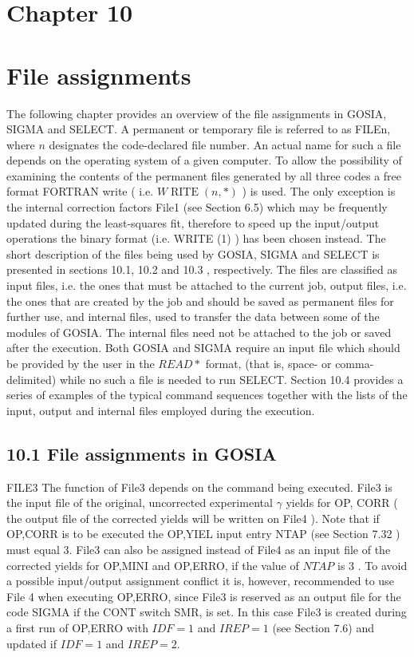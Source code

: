 \documentclass[10pt]{article}
\begin{document}
\section*{Chapter 10}
\section*{File assignments}
The following chapter provides an overview of the file assignments in GOSIA, SIGMA and SELECT. A permanent or temporary file is referred to as FILEn, where $n$ designates the code-declared file number. An actual name for such a file depends on the operating system of a given computer. To allow the possibility of examining the contents of the permanent files generated by all three codes a free format FORTRAN write ( i.e. $W \operatorname{RITE}(n, *)$ ) is used. The only exception is the internal correction factors File1 (see Section 6.5) which may be frequently updated during the least-squares fit, therefore to speed up the input/output operations the binary format (i.e. WRITE (1) ) has been chosen instead. The short description of the files being used by GOSIA, SIGMA and SELECT is presented in sections 10.1, 10.2 and 10.3 , respectively. The files are classified as input files, i.e. the ones that must be attached to the current job, output files, i.e. the ones that are created by the job and should be saved as permanent files for further use, and internal files, used to transfer the data between some of the modules of GOSIA. The internal files need not be attached to the job or saved after the execution. Both GOSIA and SIGMA require an input file which should be provided by the user in the $R E A D *$ format, (that is, space- or comma-delimited) while no such a file is needed to run SELECT. Section 10.4 provides a series of examples of the typical command sequences together with the lists of the input, output and internal files employed during the execution.

\subsection*{10.1 File assignments in GOSIA}
FILE3 The function of File3 depends on the command being executed. File3 is the input file of the original, uncorrected experimental $\gamma$ yields for OP, CORR ( the output file of the corrected yields will be written on File4 ). Note that if OP,CORR is to be executed the OP,YIEL input entry NTAP (see Section 7.32 ) must equal 3. File3 can also be assigned instead of File4 as an input file of the corrected yields for OP,MINI and OP,ERRO, if the value of $N T A P$ is 3 . To avoid a possible input/output assignment conflict it is, however, recommended to use File 4 when executing OP,ERRO, since File3 is reserved as an output file for the code SIGMA if the CONT switch SMR, is set. In this case File3 is created during a first run of OP,ERRO with $I D F=1$ and $I R E P=1$ (see Section 7.6) and updated if $I D F=1$ and $I R E P=2$.
\end{document}
